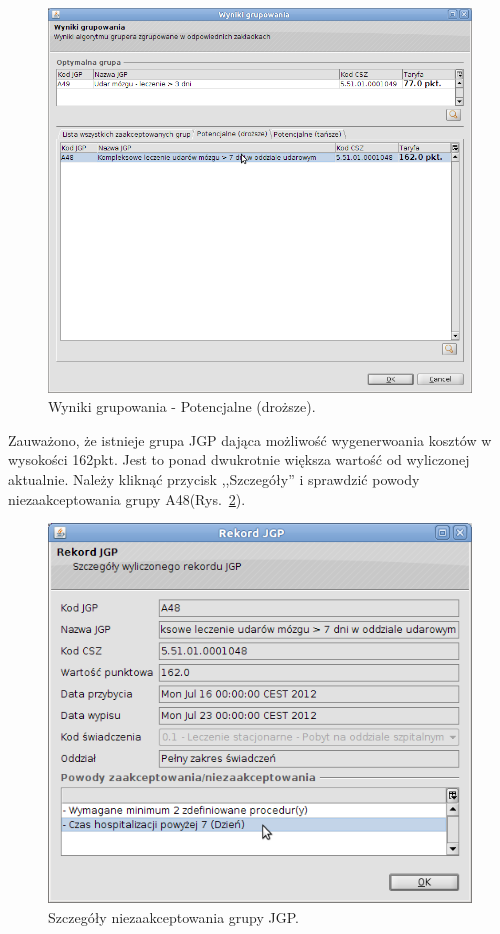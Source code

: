 \begin{figure}%
\centering
\includegraphics[scale=0.4]{images/gruper10}
\caption[Widok grupera]{Wyniki grupowania - Potencjalne (droższe).}
\label{img:gruper10}
\end{figure}

Zauważono, że istnieje grupa JGP dająca możliwość wygenerwoania kosztów w wysokości 162pkt. Jest to ponad dwukrotnie większa wartość od wyliczonej aktualnie. Należy kliknąć przycisk ,,Szczegóły'' i sprawdzić powody niezaakceptowania grupy A48(Rys.~\ref{img:gruper11}).

\begin{figure}%
\centering
\includegraphics[scale=0.4]{images/gruper11}
\caption[Widok grupera]{Szczegóły niezaakceptowania grupy JGP.}
\label{img:gruper11}
\end{figure}

